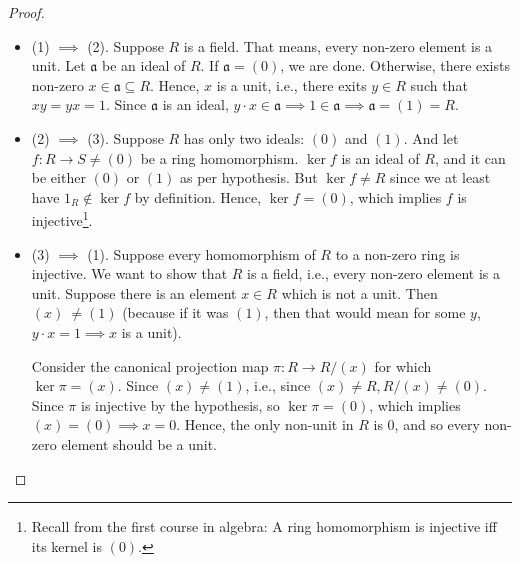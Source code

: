 \begin{proof}
    \begin{itemize}
        \item (1) \(\implies\) (2). Suppose \(R\) is a field. That means, every non-zero element is a unit. Let \(\mathfrak{a}\) be an ideal of \(R\). If \(\mathfrak{a} = (0)\), we are done. Otherwise, there exists non-zero \(x \in \mathfrak{a} \subseteq R\). Hence, \(x\) is a unit, i.e., there exits \(y \in R\) such that \(xy = yx = 1\). Since \(\mathfrak{a}\) is an ideal, \(y \cdot x \in \mathfrak{a} \implies 1 \in \mathfrak{a} \implies \mathfrak{a} = (1) = R\).

        \item (2) \(\implies\) (3). Suppose \(R\) has only two ideals: \((0)\) and \((1)\). And let \(f: R \longrightarrow S \neq (0)\) be a ring homomorphism. \(\ker f\) is an ideal of \(R\), and it can be either \((0)\) or \((1)\) as per hypothesis. But \(\ker f \neq R\) since we at least have \(1_R \not\in \ker f\) by definition. Hence, \(\ker f = (0)\), which implies \(f\) is injective\footnote{Recall from the first course in algebra: A ring homomorphism is injective iff its kernel is \((0)\).}.
        
        \item (3) \(\implies\) (1). Suppose every homomorphism of \(R\) to a non-zero ring is injective. We want to show that \(R\) is a field, i.e., every non-zero element is a unit. Suppose there is an element \(x \in R\) which is not a unit. Then \((x)\ \neq (1)\) (because if it was \((1)\), then that would mean for some \(y\), \(y \cdot x = 1 \implies x\) is a unit). 

            Consider the canonical projection map \(\pi: R \to R/(x)\) for which \(\ker \pi = (x)\). Since \((x) \neq (1)\), i.e., since \((x) \neq R, R/(x) \neq (0)\). Since \(\pi\) is injective by the hypothesis, so \(\ker \pi = (0)\), which implies \((x) = (0) \implies x = 0\). Hence, the only non-unit in \(R\) is \(0\), and so every non-zero element should be a unit.
    \end{itemize}
\end{proof}
